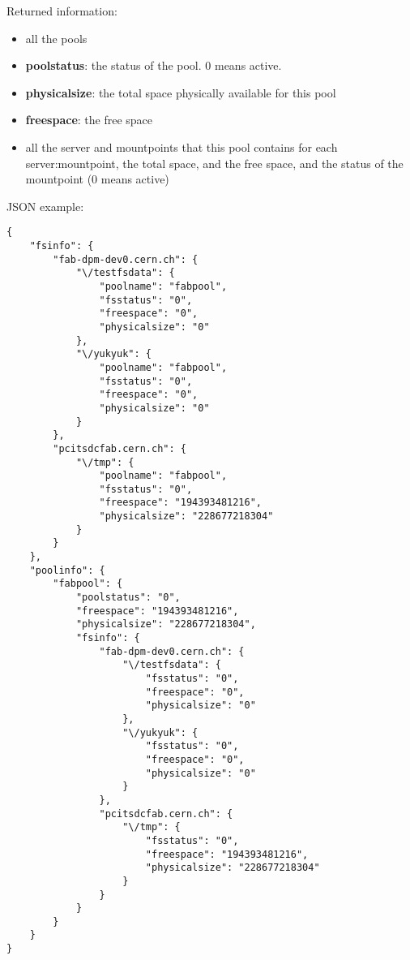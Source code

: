 \documentclass[a4paper,10pt]{scrreprt}
\begin{document}
Returned information:
\begin{itemize}
 \item all the pools
 \item \textbf{poolstatus}: the status of the pool. 0 means active.
 \item \textbf{physicalsize}: the total space physically available for this pool
 \item \textbf{freespace}: the free space
 
 
 \item all the server and mountpoints that this pool contains
 \subitem for each server:mountpoint, the total space, and the free space, and the status of the mountpoint (0 means active)
\end{itemize}

JSON example:\\
\begin{lstlisting}
{
    "fsinfo": {
        "fab-dpm-dev0.cern.ch": {
            "\/testfsdata": {
                "poolname": "fabpool",
                "fsstatus": "0",
                "freespace": "0",
                "physicalsize": "0"
            },
            "\/yukyuk": {
                "poolname": "fabpool",
                "fsstatus": "0",
                "freespace": "0",
                "physicalsize": "0"
            }
        },
        "pcitsdcfab.cern.ch": {
            "\/tmp": {
                "poolname": "fabpool",
                "fsstatus": "0",
                "freespace": "194393481216",
                "physicalsize": "228677218304"
            }
        }
    },
    "poolinfo": {
        "fabpool": {
            "poolstatus": "0",
            "freespace": "194393481216",
            "physicalsize": "228677218304",
            "fsinfo": {
                "fab-dpm-dev0.cern.ch": {
                    "\/testfsdata": {
                        "fsstatus": "0",
                        "freespace": "0",
                        "physicalsize": "0"
                    },
                    "\/yukyuk": {
                        "fsstatus": "0",
                        "freespace": "0",
                        "physicalsize": "0"
                    }
                },
                "pcitsdcfab.cern.ch": {
                    "\/tmp": {
                        "fsstatus": "0",
                        "freespace": "194393481216",
                        "physicalsize": "228677218304"
                    }
                }
            }
        }
    }
}
\end{lstlisting}
\end{document}
